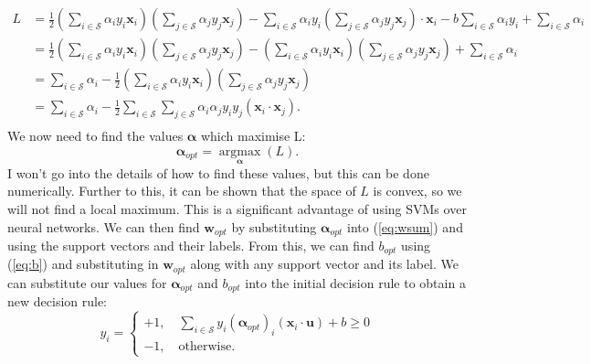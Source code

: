 \documentclass[12pt,a4paper,twoside,openright]{report}
\begin{document}
\begin{equation} \label{eq:separableL}
\begin{aligned}
	L & = \frac{1}{2}(\sum_{i \in \mathcal{S}} \alpha_i y_i \mathbf{x}_i)(\sum_{j \in \mathcal{S}} \alpha_j y_j \mathbf{x}_j) - \sum_{i \in \mathcal{S}} \alpha_i y_i(\sum_{j \in \mathcal{S}} \alpha_j y_j \mathbf{x}_j) \cdot \mathbf{x}_i - b\sum_{i \in \mathcal{S}} \alpha_i y_i + \sum_{i \in \mathcal{S}} \alpha_i \\
	& = \frac{1}{2}(\sum_{i \in \mathcal{S}} \alpha_i y_i \mathbf{x}_i)(\sum_{j \in \mathcal{S}} \alpha_j y_j \mathbf{x}_j) - (\sum_{i \in \mathcal{S}} \alpha_i y_i \mathbf{x}_i)(\sum_{j \in \mathcal{S}} \alpha_j y_j \mathbf{x}_j) + \sum_{i \in \mathcal{S}} \alpha_i \\
	& = \sum_{i \in \mathcal{S}} \alpha_i - \frac{1}{2}(\sum_{i \in \mathcal{S}} \alpha_i y_i \mathbf{x}_i)(\sum_{j \in \mathcal{S}} \alpha_j y_j \mathbf{x}_j) \\
	& = \sum_{i \in \mathcal{S}} \alpha_i - \frac{1}{2}\sum_{i \in \mathcal{S}} \sum_{j \in \mathcal{S}} \alpha_i \alpha_j y_i y_j (\mathbf{x}_i \cdot \mathbf{x}_j). \\
\end{aligned}
\end{equation}
We now need to find the values $\boldsymbol{\alpha}$ which maximise L:
\begin{equation} \label{eq:maximisation}
	\boldsymbol{\alpha}_{opt} = \underset{\boldsymbol{\alpha}}{\operatorname{argmax}}(L).
\end{equation}
I won't go into the details of how to find these values, but this can be done numerically. Further to this, it can be shown that the space of $L$ is convex, so we will not find a local maximum. This is a significant advantage of using SVMs over neural networks.
\newline
\newline
We can then find $\mathbf{w}_{opt}$ by substituting $\boldsymbol{\alpha}_{opt}$ into (\ref{eq:wsum}) and using the support vectors and their labels. From this, we can find $b_{opt}$ using (\ref{eq:b}) and substituting in $\mathbf{w}_{opt}$ along with any support vector and its label. We can substitute our values for $\boldsymbol{\alpha}_{opt}$ and $b_{opt}$ into the initial decision rule to obtain a new decision rule:
\begin{equation} \label{eq:separabledecision}
	y_i =
	\begin{cases}
		+1, \quad \displaystyle \sum_{i \in \mathcal{S}} y_i(\boldsymbol{\alpha}_{opt})_i (\mathbf{x}_i \cdot \mathbf{u}) + b \ge 0 \\
		-1, \quad \text{otherwise}.
	\end{cases}
\end{equation}
\end{document}
